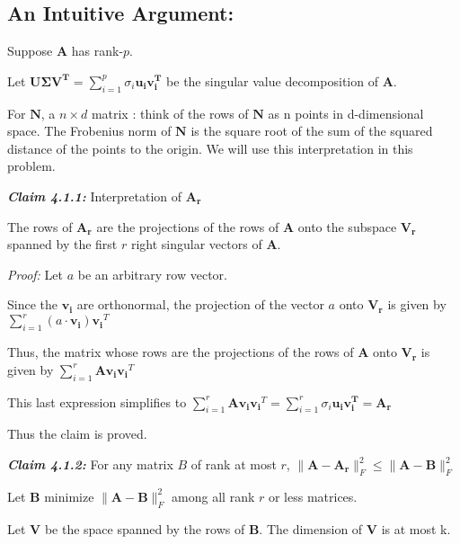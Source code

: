 \documentclass[fleqn, 11pt]{article}
\newcommand{\bs}[1]{\boldsymbol{#1}}
\begin{document}
\hrulefill

\subsection*{An Intuitive Argument: }


\medskip

Suppose $\bs{A}$ has rank-$p$.

Let $\bs{U \Sigma V^T}= \displaystyle \sum_{i=1}^{p} \sigma_i \bs{u_i v_i^T}  $ be the singular value decomposition of $\bs{A}$. 


For $\bs{N}$,  a $n \times d$ matrix : think of the rows of  $\bs{N}$ as n points in d-dimensional
space. The Frobenius norm of  $\bs{N}$ is the square root of the sum of the squared distance of
the points to the origin. We will use this interpretation in this problem. 

\newpage

{ \large  \textbf{\textit{Claim 4.1.1:}}} Interpretation of $\bs{A_r}$

\medskip

The rows of $\bs{A_r}$ are the projections of the rows of $\bs{A}$ onto the subspace $\bs{V_r}$
spanned by the first $r$ right singular vectors of $\bs{A}$. 


{\textit{Proof: }} Let $a$ be an arbitrary row vector.

Since the $\bs{v_i}$ are orthonormal, the projection of the vector $a$ onto $\bs{V_r}$ is given by 
$\displaystyle \sum_{i=1}^{r} (a \cdot \bs{v_i}) \bs{v_i}^T $

Thus, the matrix whose rows are the
projections of the rows of $\bs{A}$ onto $\bs{V_r}$  is given by 
$\displaystyle \sum_{i=1}^{r} \bs{A} \bs{v_i} \bs{v_i}^T $

This last expression simplifies to $\displaystyle \sum_{i=1}^{r} \bs{A} \bs{v_i} \bs{v_i}^T =  \displaystyle \sum_{i=1}^{r} \sigma_i \bs{u_i v_i^T} = \bs{A_r}  $


Thus the claim is proved. 

\bigskip 

{ \large  \textbf{\textit{Claim 4.1.2:}}} For any matrix $B$ of rank at most $r$, 
$  \|\boldsymbol{A}-\boldsymbol{A_r}\|^2_F \leq \|\boldsymbol{A}-\boldsymbol{B}\|^2_F $

\medskip 

Let $\bs{B}$ minimize $ \|\boldsymbol{A}-\boldsymbol{B}\|^2_F$ among all rank $r$ or less matrices.

\smallskip

Let $\bs{V}$ be the space
spanned by the rows of $\bs{B}$. The dimension of $\bs{V}$  is at most k.  
\end{document}
